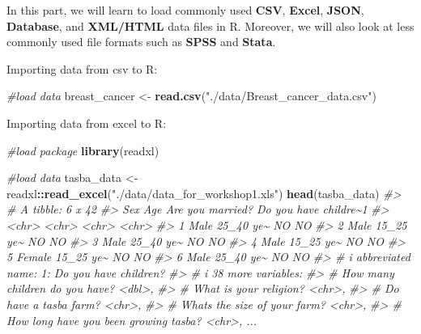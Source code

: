 \documentclass[
]{book}
\newenvironment{Shaded}{\begin{snugshade}}{\end{snugshade}}
\newcommand{\CommentTok}[1]{\textcolor[rgb]{0.56,0.35,0.01}{\textit{#1}}}
\newcommand{\FunctionTok}[1]{\textcolor[rgb]{0.13,0.29,0.53}{\textbf{#1}}}
\newcommand{\NormalTok}[1]{#1}
\newcommand{\OtherTok}[1]{\textcolor[rgb]{0.56,0.35,0.01}{#1}}
\newcommand{\SpecialCharTok}[1]{\textcolor[rgb]{0.81,0.36,0.00}{\textbf{#1}}}
\newcommand{\StringTok}[1]{\textcolor[rgb]{0.31,0.60,0.02}{#1}}
\begin{document}
In this part, we will learn to load commonly used \textbf{CSV}, \textbf{Excel}, \textbf{JSON}, \textbf{Database}, and \textbf{XML/HTML} data files in R. Moreover, we will also look at less commonly used file formats such as \textbf{SPSS} and \textbf{Stata}.

Importing data from csv to R:

\begin{Shaded}
\begin{Highlighting}[]
\CommentTok{\#load data}
\NormalTok{breast\_cancer }\OtherTok{\textless{}{-}} \FunctionTok{read.csv}\NormalTok{(}\StringTok{"./data/Breast\_cancer\_data.csv"}\NormalTok{)}
\end{Highlighting}
\end{Shaded}

Importing data from excel to R:

\begin{Shaded}
\begin{Highlighting}[]
\CommentTok{\#load package}
\FunctionTok{library}\NormalTok{(readxl)}

\CommentTok{\#load data}
\NormalTok{tasba\_data }\OtherTok{\textless{}{-}}\NormalTok{ readxl}\SpecialCharTok{::}\FunctionTok{read\_excel}\NormalTok{(}\StringTok{"./data/data\_for\_workshop1.xls"}\NormalTok{)}
\FunctionTok{head}\NormalTok{(tasba\_data)}
\CommentTok{\#\textgreater{} \# A tibble: 6 x 42}
\CommentTok{\#\textgreater{}   Sex    Age       \textasciigrave{}Are you married?\textasciigrave{} Do you  have childre\textasciitilde{}1}
\CommentTok{\#\textgreater{}   \textless{}chr\textgreater{}  \textless{}chr\textgreater{}     \textless{}chr\textgreater{}              \textless{}chr\textgreater{}                 }
\CommentTok{\#\textgreater{} 1 Male   25\_40 ye\textasciitilde{} NO                 NO                    }
\CommentTok{\#\textgreater{} 2 Male   15\_25 ye\textasciitilde{} NO                 NO                    }
\CommentTok{\#\textgreater{} 3 Male   25\_40 ye\textasciitilde{} NO                 NO                    }
\CommentTok{\#\textgreater{} 4 Male   15\_25 ye\textasciitilde{} NO                 NO                    }
\CommentTok{\#\textgreater{} 5 Female 15\_25 ye\textasciitilde{} NO                 NO                    }
\CommentTok{\#\textgreater{} 6 Male   25\_40 ye\textasciitilde{} NO                 NO                    }
\CommentTok{\#\textgreater{} \# i abbreviated name: 1: \textasciigrave{}Do you  have children?\textasciigrave{}}
\CommentTok{\#\textgreater{} \# i 38 more variables:}
\CommentTok{\#\textgreater{} \#   \textasciigrave{}How many children do you have?\textasciigrave{} \textless{}dbl\textgreater{},}
\CommentTok{\#\textgreater{} \#   \textasciigrave{}What is your religion?\textasciigrave{} \textless{}chr\textgreater{},}
\CommentTok{\#\textgreater{} \#   \textasciigrave{}Do have a tasba farm?\textasciigrave{} \textless{}chr\textgreater{},}
\CommentTok{\#\textgreater{} \#   \textasciigrave{}What\textquotesingle{}s the size of your farm?\textasciigrave{} \textless{}chr\textgreater{},}
\CommentTok{\#\textgreater{} \#   \textasciigrave{}How long have you been growing tasba?\textasciigrave{} \textless{}chr\textgreater{}, ...}
\end{Highlighting}
\end{Shaded}
\end{document}
